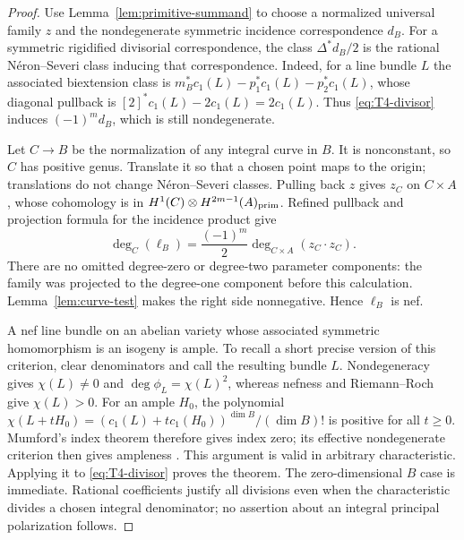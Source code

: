\begin{proof}
Use Lemma~\ref{lem:primitive-summand} to choose a normalized universal
family $z$ and the nondegenerate symmetric incidence correspondence
$d_B$. For a symmetric rigidified divisorial correspondence, the
class $\Delta^*d_B/2$ is the rational N\'eron--Severi class inducing
that correspondence. Indeed, for a line bundle $L$ the associated
biextension class is
$m_B^*c_1(L)-p_1^*c_1(L)-p_2^*c_1(L)$, whose diagonal pullback is
$[2]^*c_1(L)-2c_1(L)=2c_1(L)$.
Thus \eqref{eq:T4-divisor} induces $(-1)^md_B$, which is still
nondegenerate.

Let $C\to B$ be the normalization of any integral curve in $B$.
It is nonconstant, so $C$ has positive genus. Translate it so that a
chosen point maps to the origin; translations do not change
N\'eron--Severi classes. Pulling back $z$ gives $z_C$ on $C\times A$,
whose cohomology is in
$H^1(C)\otimes H^{2m-1}(A)_{\rm prim}$.
Refined pullback and projection formula for the incidence product give
\begin{equation}\label{eq:degree-test}
 \deg_C(\ell_B)=\frac{(-1)^m}{2}
       \deg_{C\times A}(z_C\cdot z_C).
\end{equation}
There are no omitted degree-zero or degree-two parameter components:
the family was projected to the degree-one component before this
calculation. Lemma~\ref{lem:curve-test} makes the right side
nonnegative. Hence $\ell_B$ is nef.

A nef line bundle on an abelian variety whose associated symmetric
homomorphism is an isogeny is ample. To recall a short precise version
of this criterion, clear denominators and call the resulting bundle
$L$. Nondegeneracy gives $\chi(L)\ne0$ and
$\deg\phi_L=\chi(L)^2$, whereas nefness and Riemann--Roch give
$\chi(L)>0$. For an ample $H_0$, the polynomial
$\chi(L+tH_0)=(c_1(L)+tc_1(H_0))^{\dim B}/(\dim B)!$
is positive for all $t\ge0$. Mumford's index theorem therefore gives
index zero; its effective nondegenerate criterion then gives
ampleness \cite[Chapter~III, \S16, Index Theorem, and Chapter~II,
\S6, Application~1]{MumfordAV}. This argument is valid in arbitrary
characteristic. Applying it to \eqref{eq:T4-divisor} proves the theorem.
The zero-dimensional $B$ case is immediate. Rational coefficients
justify all divisions even when the characteristic divides a chosen
integral denominator; no assertion about an integral principal
polarization follows.
\end{proof}

